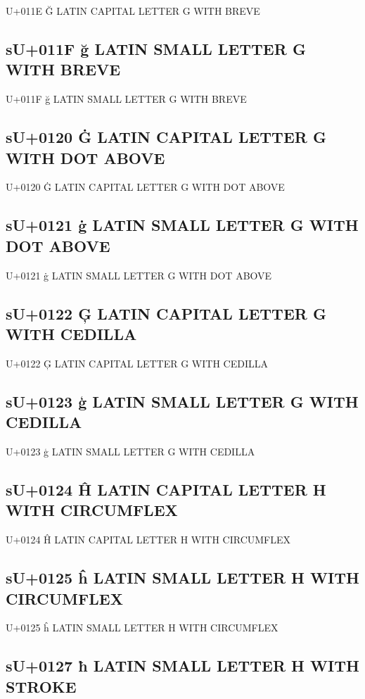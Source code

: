 U+011E Ğ  LATIN CAPITAL LETTER G WITH BREVE

\subsection{sU+011F ğ  LATIN SMALL LETTER G WITH BREVE}

U+011F ğ  LATIN SMALL LETTER G WITH BREVE

\subsection{sU+0120 Ġ  LATIN CAPITAL LETTER G WITH DOT ABOVE}

U+0120 Ġ  LATIN CAPITAL LETTER G WITH DOT ABOVE

\subsection{sU+0121 ġ  LATIN SMALL LETTER G WITH DOT ABOVE}

U+0121 ġ  LATIN SMALL LETTER G WITH DOT ABOVE

\subsection{sU+0122 Ģ  LATIN CAPITAL LETTER G WITH CEDILLA}

U+0122 Ģ  LATIN CAPITAL LETTER G WITH CEDILLA

\subsection{sU+0123 ģ  LATIN SMALL LETTER G WITH CEDILLA}

U+0123 ģ  LATIN SMALL LETTER G WITH CEDILLA

\subsection{sU+0124 Ĥ  LATIN CAPITAL LETTER H WITH CIRCUMFLEX}

U+0124 Ĥ  LATIN CAPITAL LETTER H WITH CIRCUMFLEX

\subsection{sU+0125 ĥ  LATIN SMALL LETTER H WITH CIRCUMFLEX}

U+0125 ĥ  LATIN SMALL LETTER H WITH CIRCUMFLEX

\subsection{sU+0127 ħ LATIN SMALL LETTER H WITH STROKE}

